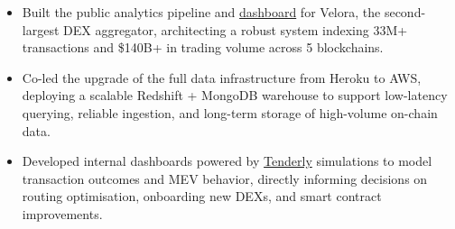 \documentclass[10pt,a4paper,ragged2e]{altacv}
\begin{document}
\divider
{}
\begin{itemize}
    \item {Built the public analytics pipeline and \href{https://dashboard.velora.xyz/public/dashboard/bb8b5007-ecc3-44e9-bdbe-b4b7a5273eb4}{dashboard} for Velora, the second-largest DEX aggregator, architecting a robust system indexing 33M+ transactions and \$140B+ in trading volume across 5 blockchains.}
    \item {Co-led the upgrade of the full data infrastructure from Heroku to AWS, deploying a scalable Redshift + MongoDB warehouse to support low-latency querying, reliable ingestion, and long-term storage of high-volume on-chain data.}
    \item {Developed internal dashboards powered by \href{https://tenderly.co/}{Tenderly} simulations to model transaction outcomes and MEV behavior, directly informing decisions on routing optimisation, onboarding new DEXs, and smart contract improvements.}
\end{itemize}
\clearpage
\end{document}
